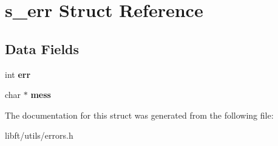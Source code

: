 \hypertarget{structs__err}{}\section{s\+\_\+err Struct Reference}
\label{structs__err}
\subsection*{Data Fields}
\begin{DoxyCompactItemize}
\item 
\hypertarget{structs__err_a6ce68847c12434f60d1b2654a3dc3409}{}int {\bfseries err}\label{structs__err_a6ce68847c12434f60d1b2654a3dc3409}

\item 
\hypertarget{structs__err_a30516a28ac7655f38268cb3d01dd5115}{}char $\ast$ {\bfseries mess}\label{structs__err_a30516a28ac7655f38268cb3d01dd5115}

\end{DoxyCompactItemize}


The documentation for this struct was generated from the following file\+:\begin{DoxyCompactItemize}
\item 
libft/utils/errors.\+h\end{DoxyCompactItemize}

